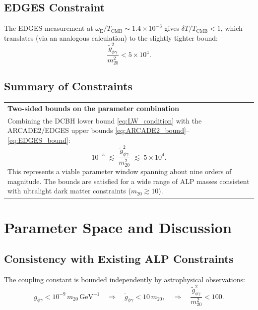 \documentclass[12pt,a4paper]{report}
\newenvironment{keyresult}[1][Key Result]{%
  \par\medskip\noindent
  \begin{tabular}{|p{\dimexpr\linewidth-2\tabcolsep-2\arrayrulewidth\relax}|}
  \hline
  \textbf{#1}\\[2pt]
}{%
  \\ \hline
  \end{tabular}
  \par\medskip
}
\newcommand{\gag}{g_{\phi\gamma}}
\newcommand{\gtag}{\tilde{g}_{\phi\gamma}}
\newcommand{\TCMB}{T_{\mathrm{CMB}}}
\theoremstyle{definition}
\begin{document}
\section{EDGES Constraint}

The EDGES measurement at $\omega_{\mathrm{E}}/\TCMB\sim 1.4\times10^{-3}$ gives
$\delta T/\TCMB < 1$, which translates (via an analogous calculation) to the
slightly tighter bound:
\begin{equation}
  \frac{\gtag^2}{m_{20}^2} < 5\times10^{4}.
  \label{eq:EDGES_bound}
\end{equation}

\section{Summary of Constraints}

\begin{keyresult}[Two-sided bounds on the parameter combination]
Combining the DCBH lower bound \eqref{eq:LW_condition} with the ARCADE2/EDGES upper
bounds \eqref{eq:ARCADE2_bound}--\eqref{eq:EDGES_bound}:
\begin{equation}
  10^{-5} \;\lesssim\; \frac{\tilde{g}_{\phi\gamma}^2}{m_{20}^2}
  \;\lesssim\; 5\times10^4.
\end{equation}
This represents a viable parameter window spanning about nine orders of magnitude.
The bounds are satisfied for a wide range of ALP masses consistent with ultralight
dark matter constraints ($m_{20}\gtrsim 10$).
\end{keyresult}

\chapter{Parameter Space and Discussion}

\section{Consistency with Existing ALP Constraints}

The coupling constant is bounded independently by astrophysical observations:
\begin{equation}
  \gag < 10^{-9}\,m_{20}\,\mathrm{GeV}^{-1}
  \quad\Rightarrow\quad
  \gtag < 10\,m_{20},
  \quad\Rightarrow\quad
  \frac{\gtag^2}{m_{20}^2} < 100.
\end{equation}
\end{document}
